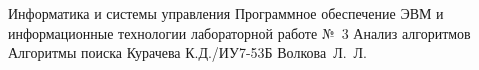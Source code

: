\documentclass{bmstu}[a4paper]
\begin{document}
	
	\makereporttitle
	{Информатика и системы управления}
	{Программное обеспечение ЭВМ и информационные технологии}
	{лабораторной работе №~3}
	{Анализ алгоритмов}
	{Алгоритмы поиска}
	{}
	{Курачева К.Д./ИУ7-53Б}
	{Волкова~Л.~Л.}
	
	\maketableofcontents
	
	
	
	
	
	
	
	
	\makebibliography
	
	
	
	
\end{document}
